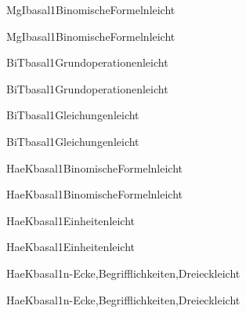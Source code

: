 \documentclass[12pt]{article}
\begin{document}
\pagecolor{black}

\begin{Add}{MgI}{basal1}{BinomischeFormeln}{leicht}
\solution{ }
\end{Add}
\begin{Add}{MgI}{basal1}{BinomischeFormeln}{leicht}
\end{Add}

\begin{Add}{BiT}{basal1}{Grundoperationen}{leicht}
\solution{ }
\end{Add}
\begin{Add}{BiT}{basal1}{Grundoperationen}{leicht}
\end{Add}

\begin{Add}{BiT}{basal1}{Gleichungen}{leicht}
\solution{ }
\end{Add}
\begin{Add}{BiT}{basal1}{Gleichungen}{leicht}
\end{Add}

\begin{Add}{HaeK}{basal1}{BinomischeFormeln}{leicht}
\solution{ }
\end{Add}
\begin{Add}{HaeK}{basal1}{BinomischeFormeln}{leicht}
\end{Add}

\begin{Add}{HaeK}{basal1}{Einheiten}{leicht}
\solution{ }
\end{Add}
\begin{Add}{HaeK}{basal1}{Einheiten}{leicht}
\end{Add}

\begin{Add}{HaeK}{basal1}{n-Ecke,Begrifflichkeiten,Dreieck}{leicht}
\solution{ }
\end{Add}
\begin{Add}{HaeK}{basal1}{n-Ecke,Begrifflichkeiten,Dreieck}{leicht}
\end{Add}
\end{document}
